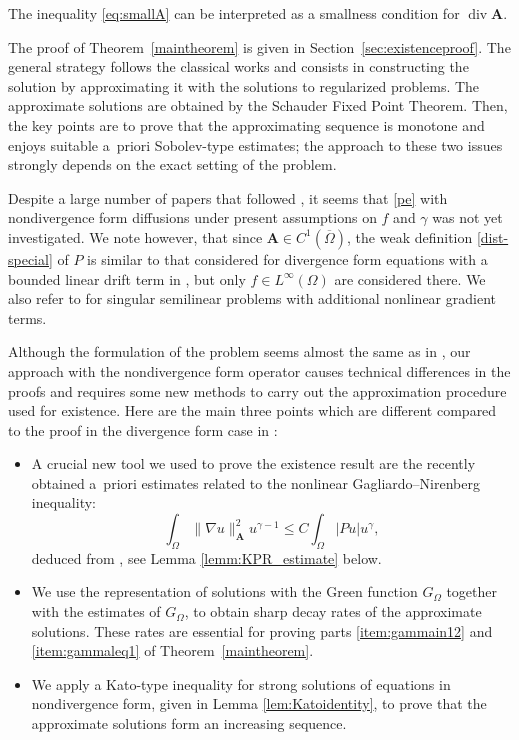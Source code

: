 \documentclass[12pt,a4paper]{amsart}
\theoremstyle{definition}
\newcommand{\A}{\mathbf{A}}
\newcommand*\Div{\operatorname{div}}
\begin{document}
   The inequality \eqref{eq:smallA} can be interpreted as a smallness condition for $\Div \A$.\smallskip
    
    The proof of Theorem~\ref{maintheorem} is given in Section~\ref{sec:existenceproof}.  The general strategy follows the classical works \cite{MR2592976,MR427826} and consists in constructing the solution by approximating it with the solutions to regularized problems. The approximate solutions are obtained by the Schauder Fixed Point Theorem. Then, the key points are to prove that the approximating sequence is monotone and enjoys suitable a~priori Sobolev-type estimates; the approach to these two issues strongly depends on the exact setting of the problem.

\smallskip
Despite a large number of papers that followed \cite{MR2592976}, it seems that \eqref{pe} with nondivergence form diffusions under present assumptions on $f$ and $\gamma$ was not yet investigated. We note however, that since $\A\in C^1(\overline{\Omega})$, the weak definition \eqref{dist-special} of $P$ is similar to
that considered for divergence form equations with a bounded linear drift term in \cite{MR3273407}, but only $f\in L^\infty(\Omega)$ are considered there. We also refer to \cite{MR4603892,MR4611538,MR3927527} for singular semilinear problems with additional nonlinear gradient terms.

Although the formulation of the problem seems almost the same as in
\cite{MR2592976}, our approach with the nondivergence form operator causes technical differences in the proofs and requires some new methods to carry out the approximation procedure used for existence. Here are the main three points which are different compared to the proof in the divergence form case in \cite{MR2592976}:
\begin{itemize}%
    \item A crucial new tool we used to prove the existence result are the recently obtained a~priori estimates related to the nonlinear Gagliardo--Nirenberg inequality:
        $$
                \int_\Omega \|\nabla u\|_\A^2 u^{\gamma -1} \le C \int_\Omega \lvert Pu \rvert u^\gamma, 
        $$
        deduced from  \cite{MR4948792}, see Lemma \ref{lemm:KPR_estimate} below.
    \item  We use the representation of solutions with the Green function $G_\Omega$ together with the estimates of $G_\Omega$, to obtain sharp decay rates of the approximate solutions. These rates are essential for proving parts \ref{item:gammain12} and \ref{item:gammaleq1} of Theorem~\ref{maintheorem}.
    \item We apply a Kato-type inequality for strong solutions of equations in nondivergence form,  given in Lemma \ref{lem:Katoidentity}, to prove that the approximate solutions form an increasing sequence. 
\end{itemize}
\end{document}
